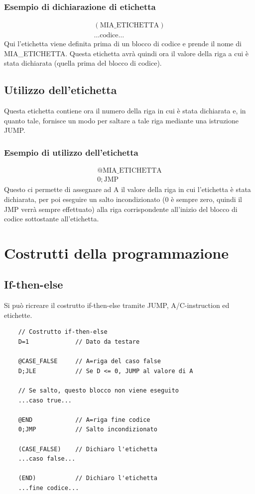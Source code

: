 \documentclass[12pt]{article}
\begin{document}
\subsubsection{Esempio di dichiarazione di etichetta}
\begin{gather*}
    (\text{MIA\_ETICHETTA})\\
    \dots \text{codice} \dots
\end{gather*}
Qui l'etichetta viene definita prima di un blocco di codice e prende il nome di MIA\_ETICHETTA.
Questa etichetta avrà quindi ora il valore della riga a cui è stata dichiarata (quella prima del blocco di codice).

\subsection{Utilizzo dell'etichetta}
Questa etichetta contiene ora il numero della riga in cui è stata dichiarata e, in quanto tale, fornisce un modo per saltare a tale riga mediante una istruzione JUMP.
\subsubsection{Esempio di utilizzo dell'etichetta}
\begin{gather*}
    @\text{MIA\_ETICHETTA}\\
    0;\text{JMP}
\end{gather*}
Questo ci permette di assegnare ad A il valore della riga in cui l'etichetta è stata dichiarata, per poi eseguire un salto incondizionato (0 è sempre zero, quindi il JMP verrà sempre effettuato) alla riga corrispondente all'inizio del blocco di codice sottostante all'etichetta.
\pagebreak

\section{Costrutti della programmazione}

\subsection{If-then-else}
Si può ricreare il costrutto if-then-else tramite JUMP, A/C-instruction ed etichette.
\begin{lstlisting}
    // Costrutto if-then-else
    D=1             // Dato da testare

    @CASE_FALSE     // A=riga del caso false
    D;JLE           // Se D <= 0, JUMP al valore di A

    // Se salto, questo blocco non viene eseguito
    ...caso true... 

    @END            // A=riga fine codice
    0;JMP           // Salto incondizionato

    (CASE_FALSE)    // Dichiaro l'etichetta
    ...caso false...

    (END)           // Dichiaro l'etichetta
    ...fine codice...
\end{lstlisting}
\end{document}
